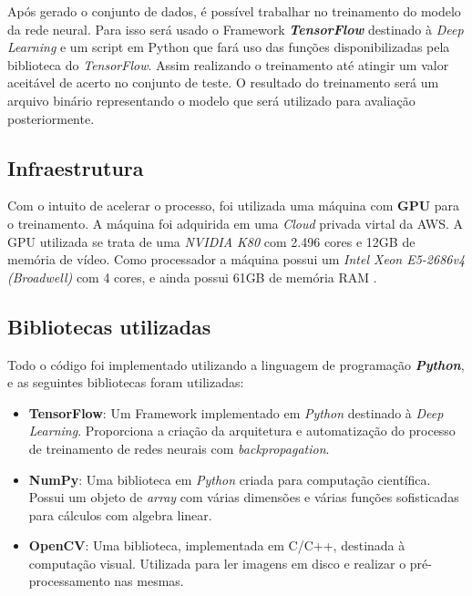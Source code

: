 Após gerado o conjunto de dados, é possível trabalhar no treinamento
do modelo da rede neural. Para isso será usado o Framework {\bf
  \emph{TensorFlow}}\cite{TensorFlow} destinado à \textit{Deep
  Learning} e um script em Python que fará uso das funções
disponibilizadas pela biblioteca do \textit{TensorFlow}. Assim
realizando o treinamento até atingir um valor aceitável de acerto no
conjunto de teste. O resultado do treinamento será um arquivo binário
representando o modelo que será utilizado para avaliação
posteriormente.

\subsection{Infraestrutura}

Com o intuito de acelerar o processo, foi utilizada uma
máquina com {\bf GPU} para o treinamento. A máquina foi adquirida em
uma \textit{Cloud} privada virtal da AWS. A GPU utilizada se trata de
uma \textit{NVIDIA K80} com 2.496 cores e 12GB de memória de
vídeo. Como processador a máquina possui um \textit{Intel Xeon
  E5-2686v4 (Broadwell)} com 4 cores, e ainda possui 61GB de memória
RAM \cite{GPUinstance}.

\subsection{Bibliotecas utilizadas}

Todo o código foi implementado utilizando a linguagem de programação
{\bf \emph{Python}}, e as seguintes bibliotecas foram utilizadas:

\begin{itemize}

\item {\bf TensorFlow}\cite{TensorFlow}: Um Framework implementado em
  \textit{Python} destinado à \textit{Deep Learning}. Proporciona a criação da
  arquitetura e automatização do processo de treinamento de redes
  neurais com \textit{backpropagation}.

\item {\bf NumPy}\cite{NumPy}: Uma biblioteca em \textit{Python}
  criada para computação científica. Possui um objeto de
  \textit{array} com várias dimensões e várias funções sofisticadas
  para cálculos com algebra linear.

\item {\bf OpenCV}\cite{OpenCV}: Uma biblioteca, implementada em
  C/C++, destinada à computação visual. Utilizada para ler imagens em
  disco e realizar o pré-processamento nas mesmas.

\end{itemize}

